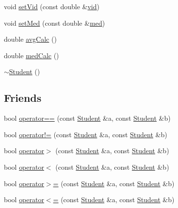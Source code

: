 \begin{DoxyCompactItemize}
\item 
void \mbox{\hyperlink{class_student_a4834bbde9c9dffa6f5db82f1f65367fe}{set\+Vid}} (const double \&\mbox{\hyperlink{class_student_aadb9af906a6e62c80ae87496b718ba01}{vid}})
\item 
void \mbox{\hyperlink{class_student_a129afdaabbf26f19413101595a8428b2}{set\+Med}} (const double \&\mbox{\hyperlink{class_student_a38b3e368f66757d5ab99fea91e579024}{med}})
\item 
double \mbox{\hyperlink{class_student_acd913a7c6b923d65088e6aebb8aed6cf}{avg\+Calc}} ()
\item 
double \mbox{\hyperlink{class_student_a3d9abf4e847a325a49ba91e07d6f9594}{med\+Calc}} ()
\item 
\mbox{\hyperlink{class_student_a54a8ea060d6cd04222c3a2f89829f105}{$\sim$\+Student}} ()
\end{DoxyCompactItemize}
\subsection*{Friends}
\begin{DoxyCompactItemize}
\item 
bool \mbox{\hyperlink{class_student_a3964d3cf585d930b3e6c9eb6379ba41f}{operator==}} (const \mbox{\hyperlink{class_student}{Student}} \&a, const \mbox{\hyperlink{class_student}{Student}} \&b)
\item 
bool \mbox{\hyperlink{class_student_a4643d09d419d6f688192fe759cebbad0}{operator!=}} (const \mbox{\hyperlink{class_student}{Student}} \&a, const \mbox{\hyperlink{class_student}{Student}} \&b)
\item 
bool \mbox{\hyperlink{class_student_a8e8f9cb02695bbd70ae3f6af951d59c0}{operator$>$}} (const \mbox{\hyperlink{class_student}{Student}} \&a, const \mbox{\hyperlink{class_student}{Student}} \&b)
\item 
bool \mbox{\hyperlink{class_student_ae65f7355c5b9e95117aaf9bc93660ce9}{operator$<$}} (const \mbox{\hyperlink{class_student}{Student}} \&a, const \mbox{\hyperlink{class_student}{Student}} \&b)
\item 
bool \mbox{\hyperlink{class_student_ac4cc7f272c704f41a99407c32130ea0f}{operator$>$=}} (const \mbox{\hyperlink{class_student}{Student}} \&a, const \mbox{\hyperlink{class_student}{Student}} \&b)
\item 
bool \mbox{\hyperlink{class_student_a69e41c3e46d67c367756caad801aada5}{operator$<$=}} (const \mbox{\hyperlink{class_student}{Student}} \&a, const \mbox{\hyperlink{class_student}{Student}} \&b)
\end{DoxyCompactItemize}

